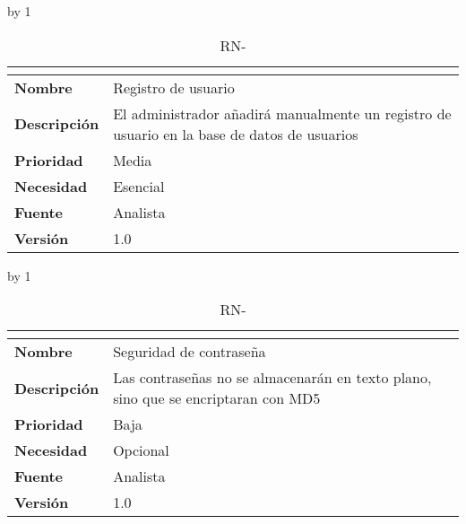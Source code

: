 \advance\rn by 1
\begin{table}[H]
	\caption{RN-\number\rn}
	\begin{tabular}{|l|p{}|}
		\hline
		\multicolumn{2}{|c|}{\cellcolor[HTML]{BFBFBF}{\color[HTML]{000000} \textbf{RN-\number\rn}}} \\ \hline
		\textbf{Nombre}      & Registro de usuario                                                                         \\ \hline
		\textbf{Descripción} & El administrador añadirá manualmente un registro de usuario en la base de datos de usuarios \\ \hline
		\textbf{Prioridad}   & Media                                                                                       \\ \hline
		\textbf{Necesidad}   & Esencial                                                                                    \\ \hline
		\textbf{Fuente}      & Analista                                                                                    \\ \hline
		\textbf{Versión}     & 1.0                                                                                         \\ \hline
	\end{tabular}
\end{table}
\advance\rn by 1
\begin{table}[H]
	\caption{RN-\number\rn}
	\begin{tabular}{|l|p{}|}
		\hline
		\multicolumn{2}{|c|}{\cellcolor[HTML]{BFBFBF}{\color[HTML]{000000} \textbf{RN-\number\rn}}} \\ \hline
		\textbf{Nombre}      & Seguridad de contraseña                                                           \\ \hline
		\textbf{Descripción} & Las contraseñas no se almacenarán en texto plano, sino que se encriptaran con MD5 \\ \hline
		\textbf{Prioridad}   & Baja                                                                              \\ \hline
		\textbf{Necesidad}   & Opcional                                                                          \\ \hline
		\textbf{Fuente}      & Analista                                                                          \\ \hline
		\textbf{Versión}     & 1.0                                                                               \\ \hline
	\end{tabular}
\end{table}
